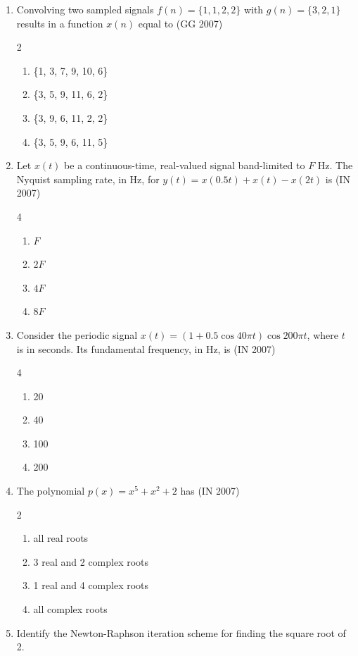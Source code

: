 \begin{enumerate}[label=\thesubsection.\arabic*,ref=\thesubsection.\theenumi]
\hfill (GE 2007)
\item Convolving two sampled signals $f(n) = \{1,1,2,2\}$ with $g(n) = \{3,2,1\}$ results in a function $x(n)$ equal to
\hfill (GG 2007)
\begin{multicols}{2}
\begin{enumerate}
\item \{1, 3, 7, 9, 10, 6\}  
\item \{3, 5, 9, 11, 6, 2\}  
\item \{3, 9, 6, 11, 2, 2\}  
\item \{3, 5, 9, 6, 11, 5\}  
\end{enumerate}
\end{multicols}
\item Let $x(t)$ be a continuous-time, real-valued signal band-limited to $F$ Hz.  
The Nyquist sampling rate, in Hz, for $y(t) = x(0.5t) + x(t) - x(2t)$ is
\hfill(IN 2007)
\begin{multicols}{4}
\begin{enumerate}
\item $F$  
\item $2F$  
\item $4F$  
\item $8F$  
\end{enumerate}
\end{multicols}
\item Consider the periodic signal $x(t) = (1 + 0.5\cos 40\pi t)\cos 200\pi t$, where $t$ is in seconds.  
Its fundamental frequency, in Hz, is
\hfill(IN 2007)
\begin{multicols}{4}
\begin{enumerate}
\item 20  
\item 40  
\item 100  
\item 200  
\end{enumerate}
\end{multicols}
\item The polynomial $p(x) = x^5 + x^2 + 2$ has  
\hfill(IN 2007)
\begin{multicols}{2}
\begin{enumerate}
\item all real roots  
\item 3 real and 2 complex roots  
\item 1 real and 4 complex roots  
\item all complex roots  
\end{enumerate}
\end{multicols}
\item Identify the Newton-Raphson iteration scheme for finding the square root of 2.  


\end{enumerate}
